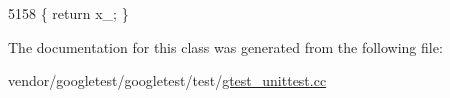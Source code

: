 \begin{DoxyCode}
5158 \{ \textcolor{keywordflow}{return} x\_; \}
\end{DoxyCode}


The documentation for this class was generated from the following file\+:\begin{DoxyCompactItemize}
\item 
vendor/googletest/googletest/test/\hyperlink{gtest__unittest_8cc}{gtest\+\_\+unittest.\+cc}\end{DoxyCompactItemize}
